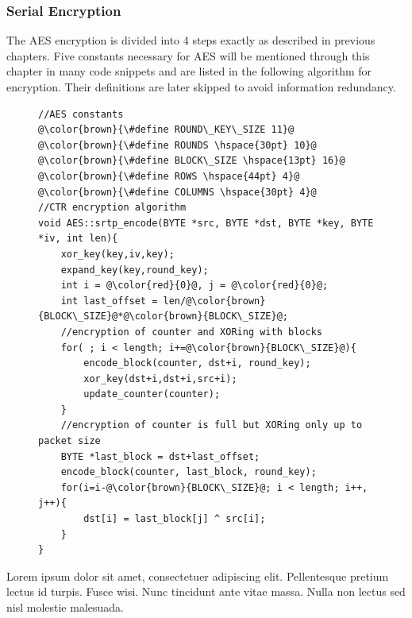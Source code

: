 \subsubsection*{Serial Encryption}
The AES encryption is divided into 4 steps exactly as described in previous
chapters. Five constants necessary for AES will be mentioned through this 
chapter in many code snippets and are listed in the following algorithm for 
encryption. Their definitions are later skipped to avoid information redundancy.

\begin{figure}[H]
\begin{lstlisting}
//AES constants
@\color{brown}{\#define ROUND\_KEY\_SIZE 11}@ 
@\color{brown}{\#define ROUNDS \hspace{30pt} 10}@ 
@\color{brown}{\#define BLOCK\_SIZE \hspace{13pt} 16}@ 
@\color{brown}{\#define ROWS \hspace{44pt} 4}@ 
@\color{brown}{\#define COLUMNS \hspace{30pt} 4}@ 
//CTR encryption algorithm
void AES::srtp_encode(BYTE *src, BYTE *dst, BYTE *key, BYTE *iv, int len){
    xor_key(key,iv,key);
    expand_key(key,round_key);
    int i = @\color{red}{0}@, j = @\color{red}{0}@;
    int last_offset = len/@\color{brown}{BLOCK\_SIZE}@*@\color{brown}{BLOCK\_SIZE}@;
    //encryption of counter and XORing with blocks
    for( ; i < length; i+=@\color{brown}{BLOCK\_SIZE}@){
        encode_block(counter, dst+i, round_key);
        xor_key(dst+i,dst+i,src+i);
        update_counter(counter);
    }
    //encryption of counter is full but XORing only up to packet size
    BYTE *last_block = dst+last_offset;
    encode_block(counter, last_block, round_key);
    for(i=i-@\color{brown}{BLOCK\_SIZE}@; i < length; i++, j++){
        dst[i] = last_block[j] ^ src[i];
    }
}
\end{lstlisting}
\end{figure}


Lorem ipsum dolor sit amet, consectetuer adipiscing elit. Pellentesque pretium lectus id turpis. Fusce wisi. Nunc tincidunt ante vitae massa. Nulla non lectus sed nisl molestie malesuada.

